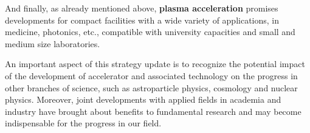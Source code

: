 And finally, as already mentioned above, {\bf plasma acceleration} promises developments for compact facilities with a wide variety of applications, in medicine, photonics, etc., compatible with university capacities and small and medium size laboratories.

An important aspect of this strategy update is to recognize the potential impact of the development of accelerator and associated technology on the progress in other branches of science, such as astroparticle physics, cosmology and nuclear physics. Moreover, joint developments with applied fields in academia and industry have brought about benefits to fundamental research and may become indispensable for the progress in our field.


%
%






